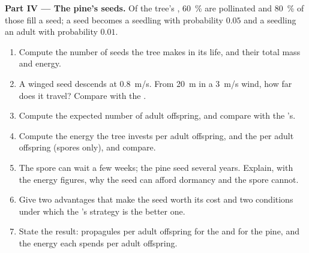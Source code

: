 \begin{problem}
\medskip
\noindent\textbf{Part IV --- The pine's seeds.}
Of the tree's , \qty{60}{\%} are pollinated and \qty{80}{\%} of
those fill a seed; a seed becomes a seedling with probability $0.05$
and a seedling an adult with probability $0.01$.
\begin{enumerate}[resume]
  \item Compute the number of seeds the tree makes in its life, and
        their total mass and energy.
  \item A winged seed descends at \qty{0.8}{m/s}. From \qty{20}{m} in
        a \qty{3}{m/s} wind, how far does it travel? Compare with the
        .
  \item Compute the expected number of adult offspring, and compare
        with the 's.
  \item Compute the energy the tree invests per adult offspring, and
        the  per adult offspring (spores only), and compare.
  \item The  spore can wait a few weeks; the pine seed several
        years. Explain, with the energy figures, why the seed can
        afford dormancy and the spore cannot.
  \item Give two advantages that make the seed worth its cost and two
        conditions under which the 's strategy is the better one.
  \item State the result: propagules per adult offspring for the
         and for the pine, and the energy each spends per adult
        offspring.
\end{enumerate}
\end{problem}
